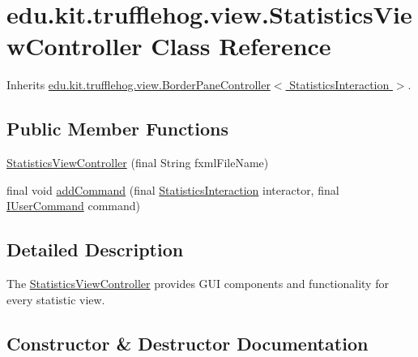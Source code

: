 \hypertarget{classedu_1_1kit_1_1trufflehog_1_1view_1_1_statistics_view_controller}{}\section{edu.\+kit.\+trufflehog.\+view.\+Statistics\+View\+Controller Class Reference}
\label{classedu_1_1kit_1_1trufflehog_1_1view_1_1_statistics_view_controller}


Inherits \hyperlink{classedu_1_1kit_1_1trufflehog_1_1view_1_1_border_pane_controller}{edu.\+kit.\+trufflehog.\+view.\+Border\+Pane\+Controller$<$ Statistics\+Interaction $>$}.

\subsection*{Public Member Functions}
\begin{DoxyCompactItemize}
\item 
\hyperlink{classedu_1_1kit_1_1trufflehog_1_1view_1_1_statistics_view_controller_a2871fed8b1a8242d768002797e934843}{Statistics\+View\+Controller} (final String fxml\+File\+Name)
\item 
final void \hyperlink{classedu_1_1kit_1_1trufflehog_1_1view_1_1_statistics_view_controller_af6c41149dcba39e91cd9b872cb088c6a}{add\+Command} (final \hyperlink{enumedu_1_1kit_1_1trufflehog_1_1interaction_1_1_statistics_interaction}{Statistics\+Interaction} interactor, final \hyperlink{interfaceedu_1_1kit_1_1trufflehog_1_1command_1_1usercommand_1_1_i_user_command}{I\+User\+Command} command)
\end{DoxyCompactItemize}


\subsection{Detailed Description}
The \hyperlink{classedu_1_1kit_1_1trufflehog_1_1view_1_1_statistics_view_controller}{Statistics\+View\+Controller} provides G\+U\+I components and functionality for every statistic view. 

\subsection{Constructor \& Destructor Documentation}
\hypertarget{classedu_1_1kit_1_1trufflehog_1_1view_1_1_statistics_view_controller_a2871fed8b1a8242d768002797e934843}{}
